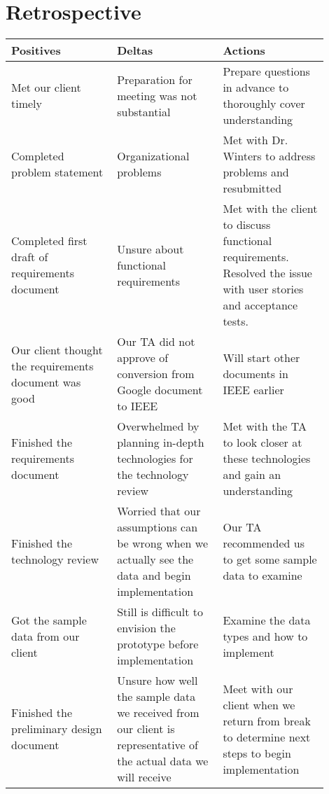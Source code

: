 \section{Retrospective}
\begin{tabular}{ | p{0.3\linewidth} | p{0.3\linewidth} |  p{0.3\linewidth} |}
\hline
\textbf{Positives} & \textbf{Deltas} & \textbf{Actions} \\ \hline

Met our client timely & Preparation for meeting was not substantial & Prepare questions in advance to thoroughly cover understanding \\ \hline

Completed problem statement & Organizational problems & Met with Dr. Winters to address problems and resubmitted \\ \hline

Completed first draft of requirements document & Unsure about functional requirements & Met with the client to discuss functional requirements. Resolved the issue with user stories and acceptance tests. \\ \hline

Our client thought the requirements document was good & Our TA did not approve of conversion from Google document to IEEE & Will start other documents in IEEE earlier \\ \hline

Finished the requirements document & Overwhelmed by planning in-depth technologies for the technology review & Met with the TA to look closer at these technologies and gain an understanding \\ \hline

Finished the technology review & Worried that our assumptions can be wrong when we actually see the data and begin implementation & Our TA recommended us to get some sample data to examine \\ \hline

Got the sample data from our client & Still is difficult to envision the prototype before implementation &  Examine the data types and how to implement \\ \hline

Finished the preliminary design document & Unsure how well the sample data we received from our client is representative of the actual data we will receive &  Meet with our client when we return from break to determine next steps to begin implementation \\ \hline

\end{tabular}